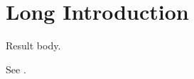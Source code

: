 \section[Short Intro]{Long Introduction}\label{sec:intro}
\begin{oblemma}\label{obs:main}
Result body.
\end{oblemma}
See .
